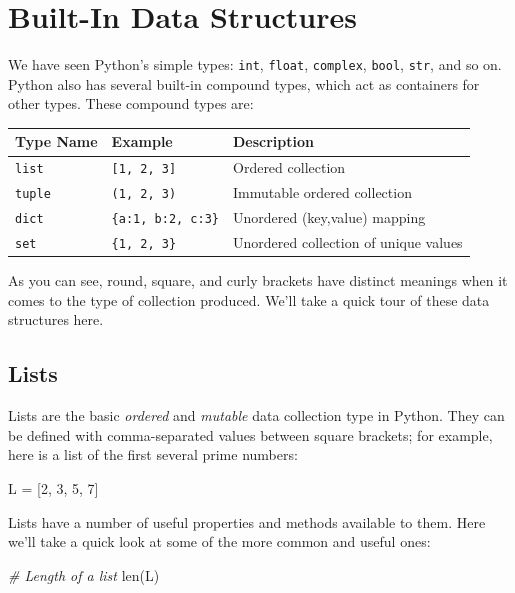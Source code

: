 \documentclass[]{article}
\date{}
\newenvironment{Shaded}{}{}
\newcommand{\DecValTok}[1]{\textcolor[rgb]{0.25,0.63,0.44}{{#1}}}
\newcommand{\CommentTok}[1]{\textcolor[rgb]{0.38,0.63,0.69}{\textit{{#1}}}}
\newcommand{\OperatorTok}[1]{\textcolor[rgb]{0.40,0.40,0.40}{{#1}}}
\newcommand{\BuiltInTok}[1]{{#1}}
\newcommand{\NormalTok}[1]{{#1}}
\begin{document}
\section{Built-In Data Structures}\label{built-in-data-structures}

We have seen Python's simple types: \texttt{int}, \texttt{float},
\texttt{complex}, \texttt{bool}, \texttt{str}, and so on. Python also
has several built-in compound types, which act as containers for other
types. These compound types are:

\begin{longtable}[c]{@{}lll@{}}
\toprule
Type Name & Example & Description\tabularnewline
\midrule
\endhead
\texttt{list} & \texttt{{[}1,\ 2,\ 3{]}} & Ordered
collection\tabularnewline
\texttt{tuple} & \texttt{(1,\ 2,\ 3)} & Immutable ordered
collection\tabularnewline
\texttt{dict} &
\texttt{\{\textquotesingle{}a\textquotesingle{}:1,\ \textquotesingle{}b\textquotesingle{}:2,\ \textquotesingle{}c\textquotesingle{}:3\}}
& Unordered (key,value) mapping\tabularnewline
\texttt{set} & \texttt{\{1,\ 2,\ 3\}} & Unordered collection of unique
values\tabularnewline
\bottomrule
\end{longtable}

As you can see, round, square, and curly brackets have distinct meanings
when it comes to the type of collection produced. We'll take a quick
tour of these data structures here.

\subsection{Lists}\label{lists}

Lists are the basic \emph{ordered} and \emph{mutable} data collection
type in Python. They can be defined with comma-separated values between
square brackets; for example, here is a list of the first several prime
numbers:

\begin{Shaded}
\begin{Highlighting}[]
\NormalTok{L }\OperatorTok{=} \NormalTok{[}\DecValTok{2}\NormalTok{, }\DecValTok{3}\NormalTok{, }\DecValTok{5}\NormalTok{, }\DecValTok{7}\NormalTok{]}
\end{Highlighting}
\end{Shaded}

Lists have a number of useful properties and methods available to them.
Here we'll take a quick look at some of the more common and useful ones:

\begin{Shaded}
\begin{Highlighting}[]
\CommentTok{# Length of a list}
\BuiltInTok{len}\NormalTok{(L)}
\end{Highlighting}
\end{Shaded}
\end{document}
